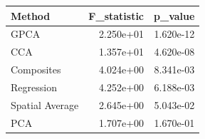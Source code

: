 \begin{tabular}{lrr}
\toprule
Method & F_statistic & p_value \\
\midrule
GPCA & 2.250e+01 & 1.620e-12 \\
CCA & 1.357e+01 & 4.620e-08 \\
Composites & 4.024e+00 & 8.341e-03 \\
Regression & 4.252e+00 & 6.188e-03 \\
Spatial Average & 2.645e+00 & 5.043e-02 \\
PCA & 1.707e+00 & 1.670e-01 \\
\bottomrule
\end{tabular}
